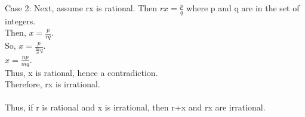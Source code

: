 Case 2: 
Next, assume rx is rational. 
Then $rx =\frac{p}{q}$ where p and q are in the set of integers. \\ 
Then, $x=\frac{p}{rq}.$ \\ 
So, $x= \frac{p}{\frac{m}{n}q}.$ \\ 
$x=\frac{np}{mq}.$ \\ 
Thus, x is rational, hence a contradiction. 
\\ Therefore, rx is irrational. \\ 


\\
Thus, if r is rational and x is irrational, then r+x and rx are irrational. 

\begin{figure}[h]\end{figure} 


